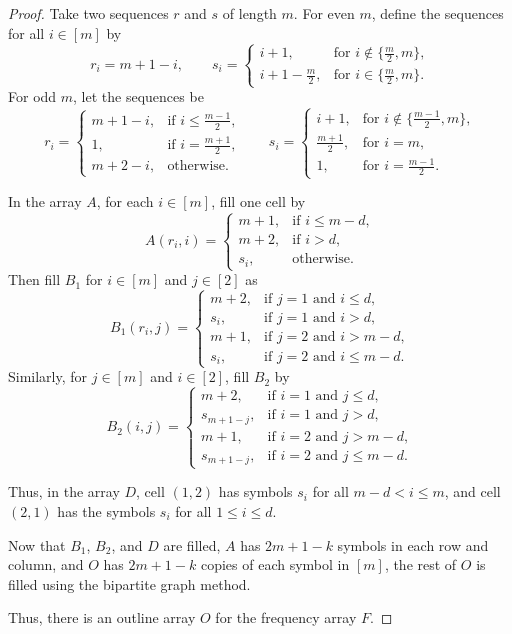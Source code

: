 \documentclass[preprint,nonatbib]{elsarticle}
\theoremstyle{definition}
\numberwithin{equation}{section}
\begin{document}
\begin{proof}
    Take two sequences $r$ and $s$ of length $m$. For even $m$, define the sequences for all $i\in[m]$ by
    $$r_i = m+1-i,\quad\quad s_i = \begin{cases}
        i+1, & \text{for $i\notin\{\frac{m}{2},m\}$,}\\
        i+1-\frac{m}{2}, & \text{for $i\in\{\frac{m}{2},m\}$.}
    \end{cases}$$
    For odd $m$, let the sequences be
    $$r_i = \begin{cases}
        m+1-i, & \text{if $i\leq\frac{m-1}{2}$,}\\
        1, & \text{if $i=\frac{m+1}{2}$,}\\
        m+2-i, & \text{otherwise.}
    \end{cases} \quad\quad s_i = \begin{cases}
        i+1, & \text{for $i\notin\{\frac{m-1}{2},m\}$,}\\
        \frac{m+1}{2}, & \text{for $i=m$,}\\
        1, & \text{for $i=\frac{m-1}{2}$.}
    \end{cases}$$

    In the array $A$, for each $i\in[m]$, fill one cell by
    $$A(r_i,i) = \begin{cases}
        m+1, & \text{if $i\leq m-d$,}\\
        m+2, & \text{if $i > d$,}\\
        s_i, & \text{otherwise.}
    \end{cases}$$
    Then fill $B_1$ for $i\in[m]$ and $j\in[2]$ as
    $$B_1(r_i,j) = \begin{cases}
        m+2, & \text{if $j=1$ and $i\leq d$,}\\
        s_i, & \text{if $j=1$ and $i> d$,}\\
        m+1, & \text{if $j=2$ and $i> m-d$,}\\
        s_i, & \text{if $j=2$ and $i\leq m-d$.}
    \end{cases}$$
    Similarly, for $j\in[m]$ and $i\in[2]$, fill $B_2$ by
    $$B_2(i,j) = \begin{cases}
        m+2, & \text{if $i=1$ and $j\leq d$,}\\
        s_{m+1-j}, & \text{if $i=1$ and $j> d$,}\\
        m+1, & \text{if $i=2$ and $j> m-d$,}\\
        s_{m+1-j}, & \text{if $i=2$ and $j\leq m-d$.}
    \end{cases}$$

    Thus, in the array $D$, cell $(1,2)$ has symbols $s_i$ for all $m-d<i\leq m$, and cell $(2,1)$ has the symbols $s_i$ for all $1\leq i\leq d$.

    Now that $B_1$, $B_2$, and $D$ are filled, $A$ has $2m+1-k$ symbols in each row and column, and $O$ has $2m+1-k$ copies of each symbol in $[m]$, the rest of $O$ is filled using the bipartite graph method.

    Thus, there is an outline array $O$ for the frequency array $F$.
\end{proof}
\end{document}
